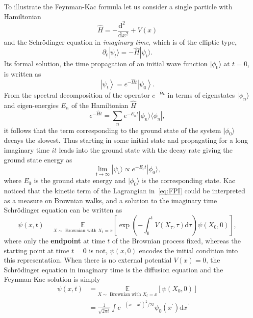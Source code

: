 To illustrate the Feynman-Kac formula let us consider a single particle with Hamiltonian
\begin{equation}
	\hat{H} = -\frac{\mathrm{d}^2~~}{\mathrm{d}x^2} + V(x)
\end{equation}
and the Schr\" odinger equation in \textit{imaginary time}, which is of the elliptic type, 
\begin{equation}
	\partial_t | \psi_t \rangle = - \hat{H} | \psi_t \rangle.
\end{equation}
Its formal solution, the time propagation of an initial wave function $|\phi_0\rangle$ at $t=0$, is written as
\begin{equation}
	\left| \psi_{t} \right\rangle = e^{-\hat{H} t}\left|\psi_{0}\right\rangle. 
\end{equation}
From the spectral decomposition of the operator $e^{-\hat{H} t}$ in terms of eigenstates $|\phi_n\rangle$ and eigen-energies $E_n$ of the Hamiltonian $\hat{H}$
\begin{equation}
	e^{-\hat{H} t}=\sum_{n} e^{-E_{n} t}|\phi_n\rangle\langle\phi_n|, 
\end{equation}
it follows that the term corresponding to the ground state of the system $|\phi_0\rangle$ decays the slowest. Thus starting in some initial state and propagating for a long imaginary time $it$ leads into the ground state with the decay rate giving the ground state energy as
\begin{equation}
	\lim_{t \rightarrow \infty} | \psi_t \rangle \propto e^{-E_0 t} | \phi_0 \rangle,
\end{equation} 
where $E_0$ is the ground state energy and $|\phi_0\rangle$ is the corresponding state. Kac noticed that the kinetic term of the Lagrangian in~\eqref{eq:FPI} could be interpreted as a measure on Brownian walks, and a solution to the imaginary time Schr\" odinger equation can be written as
\begin{equation}
	\psi(x, t)=\underset{X \sim \text { Brownian with } X_{t}=x}{\mathbb{E}}
	\left[\exp \left(-\int_{0}^{t}  V\left(X_{\tau}, \tau \right) \mathrm{d}\tau \right) \psi\left(X_{0}, 0\right)\right],
\end{equation}
where only the \textbf{endpoint} at time $t$ of the Brownian process fixed, whereas the starting point at time $t=0$ is not, $\psi (x, 0)$ encodes the initial condition into this representation. When there is no external potential $V(x) = 0$, the Schr\" odinger equation in imaginary time is the diffusion equation and the Feynman-Kac solution is simply
\begin{equation}
	\begin{aligned} 
		\psi(x, t) &= \underset{X \sim \text { Brownian with } X_{t}=x}{\mathbb{E}}\left[\psi\left(X_{0}, 0\right)\right] \\
		&=  
		\frac{1}{\sqrt{2 \pi t}} \int  e^{-\left(x-x^{\prime}\right)^{2} / 2 t} \psi_{0}\left(x^{\prime}\right) \mathrm{d} x^{\prime}
	\end{aligned}
\end{equation}
